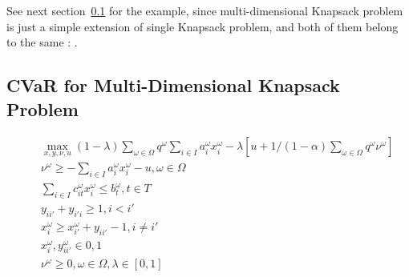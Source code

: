 See next section~\ref{subsec:CVaR_DKP} for the example, since multi-dimensional Knapsack problem
is just a simple extension of single Knapsack problem, and both of them belong to the same
: .


\subsection{CVaR for Multi-Dimensional Knapsack Problem}
\label{subsec:CVaR_DKP}

\vst {}
\begin{subequations}\label{CVaRMultiDKP}
\begin{eqnarray}
& & \max_{x, y, \nu, u} (1-\lambda)  \sum _{ \omega  \in  \Omega }^{}q^{ \omega } \sum _{i \in I}^{} a_{i}^{ \omega }x_{i}^{ \omega } - \lambda[u+1/(1-\alpha)\sum_{\omega \in \Omega} q^\omega \nu^\omega] \\
& & \nu^\omega \ge - \sum _{i \in I}^{} a_{i}^{ \omega }x_{i}^{ \omega } - u, \omega \in \Omega \\
& & \sum_{i \in I} c_{it}^\omega x_{i}^\omega \leq b_{t}^\omega, t\in T \\
& & y_{ii'} + y_{i'i} \geq 1, i<i'  \\
& & x_{i}^\omega \geq x_{i'}^\omega + y_{ii'}-1, i\neq i' \\
& & x_{i}^\omega, y_{ii'}^\omega \in {0, 1} \\
& & \nu^\omega \ge 0, \omega \in \Omega, \lambda \in [0, 1]
\end{eqnarray}
\end{subequations}

